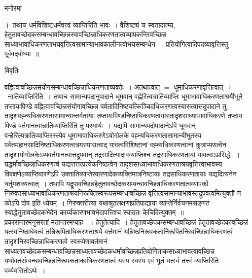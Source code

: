 \documentclass[10pt, openany]{book}
\begin{document}
{\begin{center}   मनोरमा  \end{center}
{।~तथाच धर्मविशिष्टधर्मवत्त्वं व्याप्तिरिति भावः~। वैशिष्ट्यं च स्वतादात्म्य, हेतुतावच्छेदकसम्बन्धावच्छिन्नस्वावच्छिन्नाधिकरणतात्वव्यापकनिरवच्छिन्न साध्याभावाधिकरणताभयवृत्तित्वसामान्याभावकालीनत्वोभयसम्बन्धेन~। प्रतियोगित्वादिपदव्यावृत्तिस्तु पूर्ववद्बोध्या~॥}
\newpage
\begin{center} विवृतिः \end{center}
वह्नित्वावच्छिन्नसंयोगसम्बन्धावच्छिन्नाधिकरणताव्यक्तेः~। अतथात्वात् $=$ धूमाधिकरणावृत्तित्वात्~।~{\la नातिव्याप्तिरिति~।} तथाच सामान्यपदानुपादाने धूमवान् वह्नेरित्यत्रातिव्याप्तिः धूमाभावाधिकरणताश्रयीभूते तप्तायःपिण्डे वह्नित्वावच्छिन्नसंयोगावच्छिन्न पर्वतादिनिष्ठयत्किञ्चिदधिकरणत्वस्यासत्वात्तदुपादाने तु तादृशवह्न्यधिकरणतासामान्यान्तर्गतायाः तप्तायःपिण्डनिष्ठाधिकरणतायास्तादृशसाध्याभावाधिकरणे तप्ताय पिण्डे वर्तमानत्वान्नातिव्याप्तिरिति तु परमार्थः~। यद्यपि सामान्यपदोपादानेऽपि धूमवान् वन्हेरित्यत्रातिव्याप्तिरस्त्येव धूमाभावाधिकरणेऽयोगोलके वह्न्यधिकरणतासामान्यीभूतस्य पर्वतमहानसादिनिष्टाधिकरणत्वत्रयस्यासत्वाद् यावत्वविशिष्टानां वह्न्यधिकरणत्वानां कुत्राप्यसत्वेन तादृशायोगोलकेऽप्यवर्तमानत्वात्तद्रूपवान् तद्रसादित्यादावव्याप्तिश्च तद्रसाधिकरणतायां यावत्वाऽप्रसिद्धेः~। यद्धर्मावच्छिन्नाधिकरणत्वं यद्यत्तत्तत्प्रत्येकनिष्ठत्वेन तादृशसाध्याभावाधिकरणताश्रयवृत्तित्वाभावस्य विवक्षणेऽव्याप्तिवारणेऽपि उक्तातिव्याप्तेरवारणादेकव्यक्तिमात्रनिष्टायाः तद्रसाधिकरणतायाः यद्यदित्यनेन धर्तुमशक्यत्वात्~। तथापि यद्रूपावच्छिन्नहेतुतावच्छेदकसम्बन्धावच्छिन्नाधिकरणतात्वव्यापको निरुक्तसाध्याभावाधिकरणताश्रयनिरूपितस्वरूपसम्बन्धावच्छिन्न वृत्तित्वसामान्याभावस्तद्रूपवत्वमित्युक्तौ न कोऽपि दोष इति ध्येयम्~। निरुक्तरीत्या यथाश्रुतलक्षणाप्रतिपाद्याया व्याप्तेर्निर्वचनमसङ्गतं स्याद्धेतुतावच्छेदकभेदेन कार्य्यकारणभावभेदापत्तिश्च स्यादतः केचिदित्युक्तम्~॥\\

प्रकारान्तरमनुसरतां मतान्तरमप्याह ~। हेतुतेत्यादि~। हेतुतावच्छेदकसम्बन्धावच्छिन्नं हेतुतावच्छेदकावच्छिन्नं यत्स्वनिष्ठाधेयत्वं तन्निरूपिताधिकरणताश्रये वर्त्तमानं यन्निष्ठनिरूपकतानिरूपितनिरवच्छिन्नाधिकरणत्वं तादृशनिरवच्छिन्नाधिकरणत्वे स्वरूपेणावर्तमानं साध्यतावच्छेदकसम्बन्धावच्छिन्नसाध्यतावच्छेदकधर्मावच्छिन्नप्रतियोगिताकसाध्याभावत्वावच्छिन्न यथोक्तसंम्बन्धावच्छिन्ननिरूपकताकाधिकरणतात्वं यस्य स्वस्य एवं भूतं यत्स्वं तत्त्वं व्याप्तिरिति पर्य्यवसितोऽर्थः~।\\

}
\end{document}
